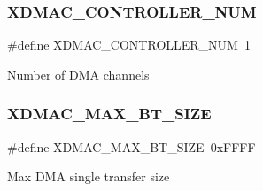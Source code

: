 \subsubsection{\texorpdfstring{XDMAC\_CONTROLLER\_NUM}{XDMAC\_CONTROLLER\_NUM}}
{\footnotesize\ttfamily \#define X\+D\+M\+A\+C\+\_\+\+C\+O\+N\+T\+R\+O\+L\+L\+E\+R\+\_\+\+N\+UM~1}

Number of D\+MA channels \mbox{\label{group__dmac__defines_ga42d9b2bdc734cf44877efb186dc33790}} 
\subsubsection{\texorpdfstring{XDMAC\_MAX\_BT\_SIZE}{XDMAC\_MAX\_BT\_SIZE}}
{\footnotesize\ttfamily \#define X\+D\+M\+A\+C\+\_\+\+M\+A\+X\+\_\+\+B\+T\+\_\+\+S\+I\+ZE~0x\+F\+F\+FF}

Max D\+MA single transfer size 